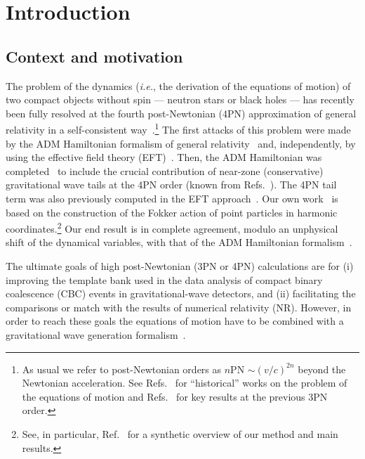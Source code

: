 \documentclass[prd,preprint,superscriptaddress,tightenlines,nofootinbib,
  eqsecnum,showpacs]{revtex4}
\begin{document}

\maketitle

\section{Introduction} 
\label{sec:intro}

\subsection{Context and motivation}
\label{sec:motiv}

The problem of the dynamics (\textit{i.e.}, the derivation of the equations of
motion) of two compact objects without spin --- neutron stars or black holes
--- has recently been fully resolved at the fourth post-Newtonian (4PN)
approximation of general relativity in a self-consistent way~\cite{BBBFMa, BBBFMb, BBBFMc, MBBF17}.\footnote{As usual we refer to
  post-Newtonian orders as $n$PN $\sim (v/c)^{2n}$ beyond the Newtonian
  acceleration. See Refs.~\cite{LD17, EIH, Fock, CE70, OO73b, OO74a, DD81b,
    Dhouches, S85, DS85, GKop86, Will, BFP98, IFA00} for ``historical'' works
  on the problem of the equations of motion and Refs.~\cite{JaraS98, JaraS99,
    BFeom, ABF01, BI03CM, DJSdim, BDE04, itoh1, itoh2, FS3PN} for key results at the
  previous 3PN order.} The first attacks of this problem were made by the ADM Hamiltonian formalism of general relativity~\cite{JaraS12, JaraS13,
  JaraS15} and, independently, by using the effective field theory
(EFT)~\cite{GR06, FS4PN, FMSS16}. Then, the ADM Hamiltonian was
completed~\cite{DJS14, DJS16} to include the crucial contribution of near-zone
(conservative) gravitational wave tails at the 4PN order (known from
Refs.~\cite{BD88, B93, B97}). The 4PN tail term was also previously computed
in the EFT approach~\cite{FStail, GLPR16}. Our own work~\cite{BBBFMa, BBBFMb,
  BBBFMc, MBBF17} is based on the construction of the Fokker action of point
particles in harmonic coordinates.\footnote{See, in particular,
  Ref.~\cite{MBBF17} for a synthetic overview of our method and main results.}
Our end result is in complete agreement, modulo an unphysical shift of the
dynamical variables, with that of the ADM Hamiltonian formalism~\cite{JaraS12,
  JaraS13, JaraS15, DJS14, DJS16}.

The ultimate goals of high post-Newtonian (3PN or 4PN) calculations are for
(i) improving the template bank used in the data analysis of compact binary
coalescence (CBC) events in gravitational-wave detectors, and (ii)
facilitating the comparisons or match with the results of numerical
relativity (NR). However, in order to reach these goals the equations of
motion have to be combined with a gravitational wave generation
formalism~\cite{Bliving14}.
\end{document}
